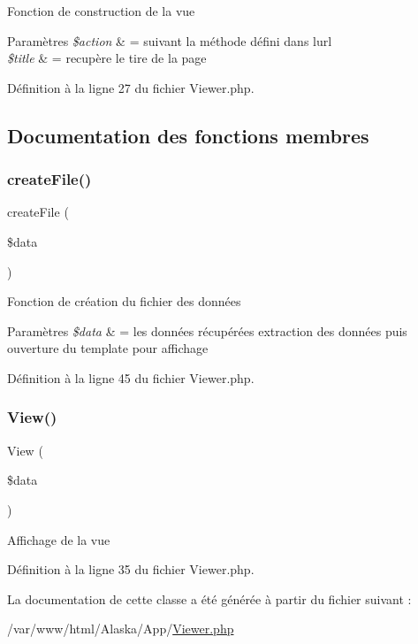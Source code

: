 Fonction de construction de la vue 
\begin{DoxyParams}{Paramètres}
{\em \$action} & = suivant la méthode défini dans l\textquotesingle{}url \\
\hline
{\em \$title} & = recupère le tire de la page \\
\hline
\end{DoxyParams}


Définition à la ligne 27 du fichier Viewer.\+php.



\subsection{Documentation des fonctions membres}
\mbox{\label{class_app_1_1_viewer_a6826cb34504c5216f4352fec9f9f27d2}} 
\subsubsection{\texorpdfstring{create\+File()}{createFile()}}
{\footnotesize\ttfamily create\+File (\begin{DoxyParamCaption}\item[{}]{\$data }\end{DoxyParamCaption})}

Fonction de création du fichier des données 
\begin{DoxyParams}{Paramètres}
{\em \$data} & = les données récupérées extraction des données puis ouverture du template pour affichage \\
\hline
\end{DoxyParams}


Définition à la ligne 45 du fichier Viewer.\+php.

\mbox{\label{class_app_1_1_viewer_ab1d271f3b152feb68aec05dd99ce8e66}} 
\subsubsection{\texorpdfstring{View()}{View()}}
{\footnotesize\ttfamily View (\begin{DoxyParamCaption}\item[{}]{\$data }\end{DoxyParamCaption})}

Affichage de la vue 

Définition à la ligne 35 du fichier Viewer.\+php.



La documentation de cette classe a été générée à partir du fichier suivant \+:\begin{DoxyCompactItemize}
\item 
/var/www/html/\+Alaska/\+App/\hyperlink{_viewer_8php}{Viewer.\+php}\end{DoxyCompactItemize}
